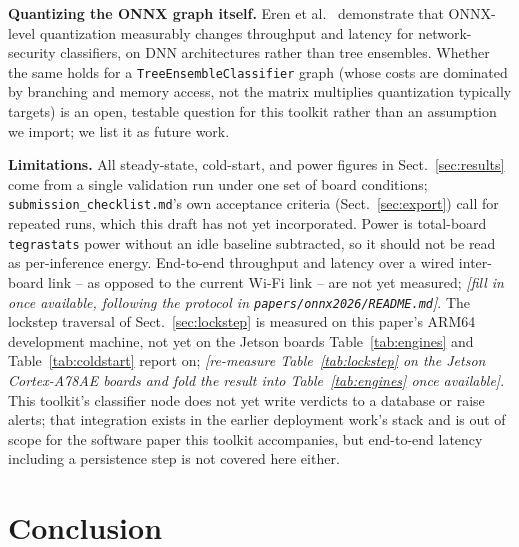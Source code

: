 \documentclass[runningheads]{llncs}
\newcommand{\ph}[1]{{\color{gray}\textit{[#1]}}}
\begin{document}
\textbf{Quantizing the ONNX graph itself.} Eren et al.~\cite{eren2026drdos} demonstrate that ONNX-level quantization measurably changes throughput and latency for network-security classifiers, on DNN architectures rather than tree ensembles. Whether the same holds for a \texttt{TreeEnsembleClassifier} graph (whose costs are dominated by branching and memory access, not the matrix multiplies quantization typically targets) is an open, testable question for this toolkit rather than an assumption we import; we list it as future work.

\textbf{Limitations.} All steady-state, cold-start, and power figures in Sect.~\ref{sec:results} come from a single validation run under one set of board conditions; \texttt{submission\_checklist.md}'s own acceptance criteria (Sect.~\ref{sec:export}) call for repeated runs, which this draft has not yet incorporated. Power is total-board \texttt{tegrastats} power without an idle baseline subtracted, so it should not be read as per-inference energy. End-to-end throughput and latency over a wired inter-board link -- as opposed to the current Wi-Fi link -- are not yet measured; \ph{fill in once available, following the protocol in \texttt{papers/onnx2026/README.md}}. The lockstep traversal of Sect.~\ref{sec:lockstep} is measured on this paper's ARM64 development machine, not yet on the Jetson boards Table~\ref{tab:engines} and Table~\ref{tab:coldstart} report on; \ph{re-measure Table~\ref{tab:lockstep} on the Jetson Cortex-A78AE boards and fold the result into Table~\ref{tab:engines} once available}. This toolkit's classifier node does not yet write verdicts to a database or raise alerts; that integration exists in the earlier deployment work's stack and is out of scope for the software paper this toolkit accompanies, but end-to-end latency including a persistence step is not covered here either.

\section{Conclusion}
\end{document}
